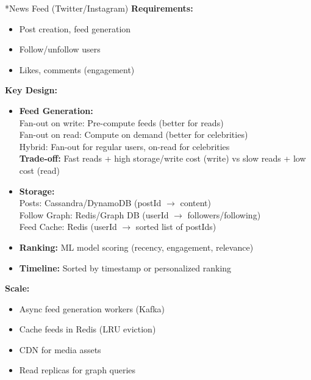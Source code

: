 \documentclass[8pt,landscape]{extarticle}
\makeatletter
\renewcommand{\subsection}{\@startsection{subsection}{2}{0pt}{3pt}{1pt}{\normalfont\normalsize\bfseries}}
\makeatother
\begin{document}
\begin{multicols*}{3}
\subsection*{News Feed (Twitter/Instagram)}
\textbf{Requirements:}
\begin{itemize}
\item Post creation, feed generation
\item Follow/unfollow users
\item Likes, comments (engagement)
\end{itemize}
\textbf{Key Design:}
\begin{itemize}
\item \textbf{Feed Generation:}
  \\ Fan-out on write: Pre-compute feeds (better for reads)
  \\ Fan-out on read: Compute on demand (better for celebrities)
  \\ Hybrid: Fan-out for regular users, on-read for celebrities
  \\ \textbf{Trade-off:} Fast reads + high storage/write cost (write) vs slow reads + low cost (read)
\item \textbf{Storage:}
  \\ Posts: Cassandra/DynamoDB (postId $\rightarrow$ content)
  \\ Follow Graph: Redis/Graph DB (userId $\rightarrow$ followers/following)
  \\ Feed Cache: Redis (userId $\rightarrow$ sorted list of postIds)
\item \textbf{Ranking:} ML model scoring (recency, engagement, relevance)
\item \textbf{Timeline:} Sorted by timestamp or personalized ranking
\end{itemize}
\textbf{Scale:}
\begin{itemize}
\item Async feed generation workers (Kafka)
\item Cache feeds in Redis (LRU eviction)
\item CDN for media assets
\item Read replicas for graph queries
\end{itemize}


\end{multicols*}
\end{document}
